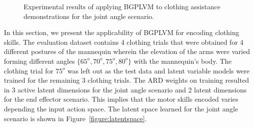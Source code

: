 \documentclass{article}
\begin{document}
\begin{figure}
  \centering
  \caption{Experimental results of applying BGPLVM to clothing assistance demonstrations for the joint angle scenario.}
  \label{figure:results}
\end{figure}

In this section, we present the applicability of BGPLVM for encoding clothing skills. The evaluation dataset contains 4 clothing trials that were obtained for 4 different postures of the mannequin wherein the elevation of the arms were varied forming different angles $\{65^o, 70^o, 75^o, 80^o\}$ with the mannequin's body. The clothing trial for $75^o$ was left out as the test data and latent variable models were trained for the remaining 3 clothing trials. The ARD weights on training resulted in 3 active latent dimensions for the joint angle scenario and 2 latent dimensions for the end effector scenario. This implies that the motor skills encoded varies depending the input action space. The latent space learned for the joint angle scenario is shown in Figure~\ref{figure:latentspace}.
\end{document}
